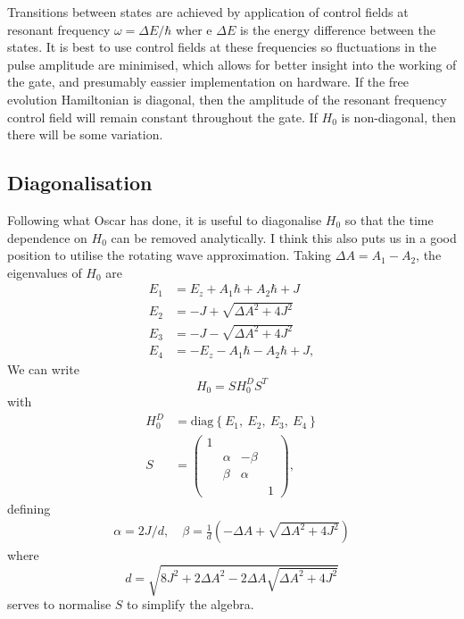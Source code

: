 \documentclass[12pt]{article}
\begin{document}
Transitions between states are achieved by application of control fields at resonant frequency $\omega=\Delta E/\hbar$ wher e $\Delta E$ is the energy difference between the states. It is best to use control fields at these frequencies so fluctuations in the pulse amplitude are minimised, which allows for better insight into the working of the gate, and presumably eassier implementation on hardware. If the free evolution Hamiltonian is diagonal, then the amplitude of the resonant frequency control field will remain constant throughout the gate. If $H_0$ is non-diagonal, then there will be some variation.

\subsection{Diagonalisation}
Following what Oscar has done, it is useful to diagonalise $H_0$ so that the time dependence on $H_0$ can be removed analytically. I think this also puts us in a good position to utilise the rotating wave approximation. Taking $\Delta A = A_1-A_2$, the eigenvalues of $H_0$ are 
\begin{align}
    E_1&=E_z+A_1\hbar+A_2\hbar+J\\
    E_2 &= -J + \sqrt{\Delta A^2 + 4J^2}\\
    E_3 &=  -J - \sqrt{\Delta A^2 + 4J^2}\\
    E_4 &= -E_z-A_1\hbar-A_2\hbar+J,
\end{align}
We can write 
\begin{equation}
    H_0 = SH_0^D S^{T}
\end{equation}
with 
\begin{align}
    H_0^D &= \text{diag}\left\{E_1,\ E_2,\ E_3,\ E_4\right\}\\
    S &= \begin{pmatrix}
    1\\
     &\alpha &-\beta\\
    &\beta &\alpha\\
    & & &1
    \end{pmatrix},
\end{align}
defining 
\begin{align}
    \alpha = 2J/d,\quad \beta = \frac{1}{d}\left(-\Delta A + \sqrt{\Delta A^2 + 4J^2}\right)
\end{align}
where
\begin{equation}
    d = \sqrt{8J^2+2\Delta A^2 - 2\Delta A\sqrt{\Delta A^2 + 4J^2}}
\end{equation}
serves to normalise $S$ to simplify the algebra.
\end{document}
